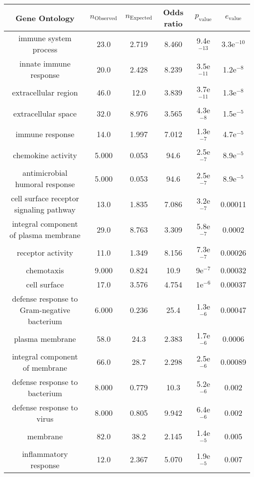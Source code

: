 \documentclass[USLetter,5pt]{article}
\begin{document}
\begin{table}[ht]
\centering
\begin{adjustbox}{width = 1\textwidth}
\small\begin{tabular}{|c|c|c|c|c|c|}
\hline
Gene Ontology & $n_{\mathrm{Observed}}$ & $n_{\mathrm{Expected}}$ & Odds ratio & $p_{\mathrm{value}}$ & $e_{\mathrm{value}}$\\
\hline
immune system process &   23.0 &  2.719 &  8.460 & 9.4e$^{-13}$ & 3.3e$^{-10}$\\
innate immune response &   20.0 &  2.428 &  8.239 & 3.5e$^{-11}$ & 1.2e$^{-8}$\\
extracellular region &   46.0 &   12.0 &  3.839 & 3.7e$^{-11}$ & 1.3e$^{-8}$\\
extracellular space &   32.0 &  8.976 &  3.565 & 4.3e$^{-8}$ & 1.5e$^{-5}$\\
immune response &   14.0 &  1.997 &  7.012 & 1.3e$^{-7}$ & 4.7e$^{-5}$\\
chemokine activity &  5.000 &  0.053 &   94.6 & 2.5e$^{-7}$ & 8.9e$^{-5}$\\
antimicrobial humoral response &  5.000 &  0.053 &   94.6 & 2.5e$^{-7}$ & 8.9e$^{-5}$\\
cell surface receptor signaling pathway &   13.0 &  1.835 &  7.086 & 3.2e$^{-7}$ & 0.00011\\
integral component of plasma membrane &   29.0 &  8.763 &  3.309 & 5.8e$^{-7}$ & 0.0002\\
receptor activity &   11.0 &  1.349 &  8.156 & 7.3e$^{-7}$ & 0.00026\\
chemotaxis &  9.000 &  0.824 &   10.9 &   9e$^{-7}$ & 0.00032\\
cell surface &   17.0 &  3.576 &  4.754 &   1e$^{-6}$ & 0.00037\\
defense response to Gram-negative bacterium &  6.000 &  0.236 &   25.4 & 1.3e$^{-6}$ & 0.00047\\
plasma membrane &   58.0 &   24.3 &  2.383 & 1.7e$^{-6}$ & 0.0006\\
integral component of membrane &   66.0 &   28.7 &  2.298 & 2.5e$^{-6}$ & 0.00089\\
defense response to bacterium &  8.000 &  0.779 &   10.3 & 5.2e$^{-6}$ &  0.002\\
defense response to virus &  8.000 &  0.805 &  9.942 & 6.4e$^{-6}$ &  0.002\\
membrane &   82.0 &   38.2 &  2.145 & 1.4e$^{-5}$ &  0.005\\
inflammatory response &   12.0 &  2.367 &  5.070 & 1.9e$^{-5}$ &  0.007\\

\end{tabular}
\end{adjustbox}
\end{table}
\end{document}
